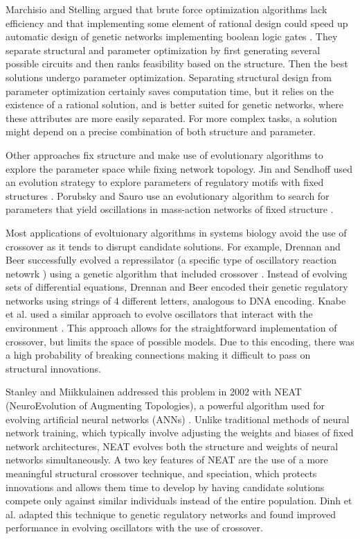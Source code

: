\documentclass[12pt]{report}
\begin{document}
Marchisio and Stelling argued that brute force optimization algorithms lack efficiency and that implementing some element of rational design could speed up automatic design of genetic networks implementing boolean logic gates \cite{marchisio_automatic_2011}. They separate structural and parameter optimization by first generating several possible circuits and then ranks feasibility based on the structure. Then the best solutions undergo parameter optimization. Separating structural design from parameter optimization certainly saves computation time, but it relies on the existence of a rational solution, and is better suited for genetic networks, where these attributes are more easily separated. For more complex tasks, a solution might depend on a precise combination of both structure and parameter.

Other approaches fix structure and make use of evolutionary algorithms to explore the parameter space while fixing network topology. Jin and Sendhoff used an evolution strategy to explore parameters of regulatory motifs with fixed structures \cite{jin_evolving_2008}. Porubsky and Sauro use an evolutionary algorithm to search for parameters that yield oscillations in mass-action networks of fixed structure \cite{porubsky2019}.

Most applications of evoltuionary algorithms in systems biology avoid the use of crossover as it tends to disrupt candidate solutions. For example, Drennan and Beer successfully evolved a repressilator (a specific type of oscillatory reaction netowrk \cite{Elowitz2000}) using a genetic algorithm that included crossover \cite{drennan_beer}. Instead of evolving sets of differential equations, Drennan and Beer encoded their genetic regulatory networks using strings of 4 different letters, analogous to DNA encoding. Knabe et al. used a similar approach to evolve oscillators that interact with the environment \cite{knabe}. This approach allows for the straightforward implementation of crossover, but limits the space of possible models. Due to this encoding, there was a high probability of breaking connections making it difficult to pass on structural innovations.

Stanley and Miikkulainen addressed this problem in 2002 with NEAT (NeuroEvolution of Augmenting Topologies), a powerful algorithm used for evolving artificial neural networks (ANNs) \cite{stanley_evolving_2002}. Unlike traditional methods of neural network training, which typically involve adjusting the weights and biases of fixed network architectures, NEAT evolves both the structure and weights of neural networks simultaneously. A two key features of NEAT are the use of a more meaningful structural crossover technique, and speciation, which protects innovations and allows them time to develop by having candidate solutions compete only against similar individuals instead of the entire population. Dinh et al. adapted this technique to genetic regulatory networks and found improved performance in evolving oscillators with the use of crossover.
\end{document}
